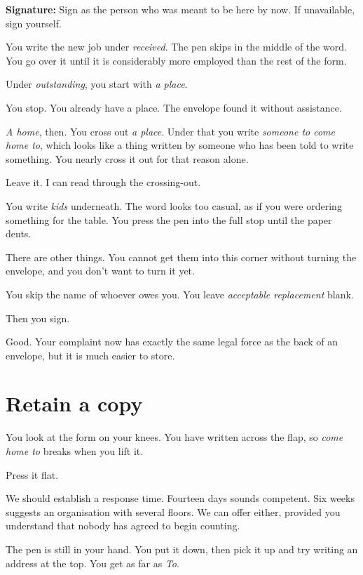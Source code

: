 \documentclass[11pt,oneside]{book}
\begin{document}
\textbf{Signature:} Sign as the person who was meant to be here by now. If unavailable, sign yourself.

You write the new job under \emph{received}. The pen skips in the middle of the word. You go over it until it is considerably more employed than the rest of the form.

Under \emph{outstanding}, you start with \emph{a place}.

You stop. You already have a place. The envelope found it without assistance.

\emph{A home}, then. You cross out \emph{a place}. Under that you write \emph{someone to come home to}, which looks like a thing written by someone who has been told to write something. You nearly cross it out for that reason alone.

Leave it. I can read through the crossing-out.

You write \emph{kids} underneath. The word looks too casual, as if you were ordering something for the table. You press the pen into the full stop until the paper dents.

There are other things. You cannot get them into this corner without turning the envelope, and you don't want to turn it yet.

You skip the name of whoever owes you. You leave \emph{acceptable replacement} blank.

Then you sign.

Good. Your complaint now has exactly the same legal force as the back of an envelope, but it is much easier to store.

\section*{Retain a copy}

You look at the form on your knees. You have written across the flap, so \emph{come home to} breaks when you lift it.

Press it flat.

We should establish a response time. Fourteen days sounds competent. Six weeks suggests an organisation with several floors. We can offer either, provided you understand that nobody has agreed to begin counting.

The pen is still in your hand. You put it down, then pick it up and try writing an address at the top. You get as far as \emph{To}.
\end{document}
